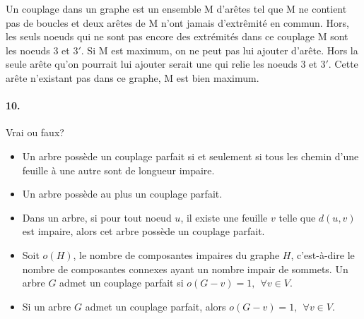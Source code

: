 \begin{figure}[h!]
  \begin{center}
  \end{center}
\end{figure}
\begin{solution}
Un couplage dans un graphe est un ensemble M d’arêtes tel que
M ne contient pas de boucles et deux arêtes de M n’ont jamais
d’extrêmité en commun. Hors, les seuls noeuds qui ne sont pas encore des extrémités dans ce couplage M sont les noeuds $3$ et $3'$. Si M est maximum, on ne peut pas lui ajouter d'arête. Hors la seule arête qu'on pourrait lui ajouter serait une qui relie les noeuds $3$ et $3'$. Cette arête n'existant pas dans ce graphe, M est bien maximum.
\end{solution}

\paragraph{10. } Vrai ou faux? \\
\begin{itemize}
  \item Un arbre possède un couplage parfait si et seulement si tous les chemin d'une feuille à une autre sont de longueur impaire.
  \item Un arbre possède au plus un couplage parfait.
  \item Dans un arbre, si pour tout noeud $u$, il existe une feuille $v$ telle que $d(u,v)$ est impaire, alors cet arbre possède un couplage parfait.
  \item Soit $o(H)$, le nombre de composantes impaires du graphe $H$, c'est-à-dire le nombre de composantes connexes ayant un nombre impair de sommets. Un arbre $G$ admet un couplage parfait si $o(G-v)=1,  \ \ \forall v \in V$.
  \item Si un arbre $G$ admet un couplage parfait, alors $o(G-v)=1, \ \ \forall v \in V$.
\end{itemize}


